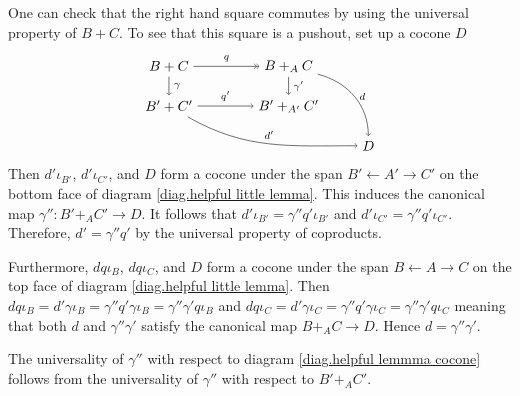 \documentclass{tac}
\newcommand{\from}{\colon}
\begin{document}
	One can check that the right hand square commutes 
	by using the universal property of $B+C$. 
	To see that this square is a pushout, set up a cocone $D$
		\begin{equation} \label{diag.helpful lemmma cocone}
			\begin{tikzpicture}[baseline=(current  bounding  box.center)]
			\node (BC) at (-1,1) {$B+C$};
			\node (BAC) at (2,1) {$B+_AC$};
			\node (BC') at (-1,0) {$B'+C'$};
			\node (BAC') at (2,0) {$B'+_{A'}C'$};
			\node (D) at (4,-1) {$D$};
			\draw [font=\scriptsize,->>] (BC) edge node[above] {$q$} (BAC);
			\draw [font=\scriptsize,->] (BC) edge node[right] {$\gamma$} (BC');
			\draw [font=\scriptsize,->] (BAC) edge node[right] {$\gamma'$} (BAC');
			\draw [font=\scriptsize,->] (BAC) edge [out=-15,in=90] node[right] {$d$} (D);
			\draw [font=\scriptsize,->.] (BC') edge node[above] {$q'$} (BAC');
			\draw [font=\scriptsize,->] (BC') edge[out=-30,in=180] node[above] {$d'$} (D);
			\end{tikzpicture}
		\end{equation}
	Then $ d' \iota_{ B' }$, $ d' \iota_{ C' }$, and $ D $ form 
	a cocone under the span 
		$ B' \leftarrow A' \to C' $ 
	on the bottom face of diagram 
		\eqref{diag.helpful little lemma}. 
	This induces the canonical map 
		$ \gamma'' \from B'+_A C' \to D $.  
	It follows that 
		$ d' \iota_{ B' } = \gamma '' q' \iota_{ B' } $ 
	and 
		$ d' \iota_{ C' } = \gamma '' q' \iota_{ C' } $. 
	Therefore, $ d ' = \gamma'' q' $ by the universal property of coproducts.
		
	Furthermore, $ d q \iota_B $, $ d q \iota_C $, and $ D $ form 
	a cocone under the span 
		$ B \leftarrow A \to C $ 
	on the top face of diagram 
		\eqref{diag.helpful little lemma}. 
	Then 
		$ d q \iota_B = 
			d ' \gamma \iota_B = 
			\gamma '' q' \gamma \iota_B = 
			\gamma '' \gamma' q \iota_B$ 
	and 
		$ d q \iota_C = 
			d ' \gamma \iota_C = 
			\gamma '' q ' \gamma \iota_C = 
			\gamma '' \gamma ' q \iota_C$ 
	meaning that both $d$ and 
		$ \gamma '' \gamma ' $ 
	satisfy the canonical map 
		$ B +_A C \to D$.  
	Hence $ d = \gamma '' \gamma ' $. 
		
	The universality of $ \gamma'' $ with respect to diagram 
		\eqref{diag.helpful lemmma cocone} 
	follows from the universality of $ \gamma'' $ with respect to $ B' +_A C' $.
\endproof
\end{document}
